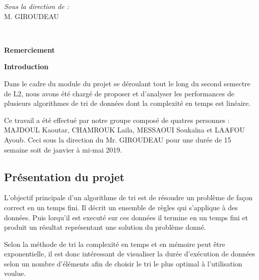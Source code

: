\documentclass[12pt]{article}
\begin{document}
\begin{titlepage}
\begin{minipage}{0.4\textwidth}
			\begin{flushright} \large
			\emph{Sous la direction de  :} \\
			M. GIROUDEAU\\
        
		\end{flushright}
        
	\end{minipage}\\[2 cm]
	
	
    
    
    
    
	
\end{titlepage}

\LARGE\textbf{Remerciement}\\ \vspace{0.5 cm}


\newpage

\LARGE\textbf{Introduction}\\ \vspace{0.5 cm}

\normalsize{
\hspace{1.0 cm} Dans le cadre du module du projet se déroulant tout le long du second semectre de L2, nous avons
été chargé de proposer et d'analyser les performances de plusieurs algorithmes de tri de données dont la complexité en temps
est linéaire.

\hspace{1.0 cm} Ce travail a été effectué par notre groupe composé de quatres personnes : MAJDOUL Kaoutar, CHAMROUK Laila, MESSAOUI 
Soukaîna et LAAFOU Ayoub. Ceci sous la direction du Mr. GIROUDEAU pour une durée de 15 semaine soit de janvier à mi-mai 2019.}

\subsection*{Présentation du projet}
 
\hspace{1.0 cm}  L'objectif principale d'un algorithme de tri est de résoudre un problème de façon correct en un temps fini. Il décrit un ensemble de règles qui s'applique à des données. Puis lorqu'il est executé sur ces données il termine en un temps fini et produit un résultat représentant une solution du problème donné.

\hspace{1.0 cm}Selon la méthode de tri la complexité en temps et en mémoire peut être exponentielle, il est donc intéressant de visualiser la durée d'exécution de données selon un nombre d'éléments afin de choisir le tri le plus optimal à l'utilisation voulue.
\end{document}
